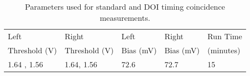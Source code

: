 \begin{table}
\caption{\label{tab:optimumparam} Parameters used for standard and DOI timing coincidence measurements.} 
\begin{tabular}{lllll}
\hline
Left &  Right & Left & Right & Run Time\\
Threshold (V) & Threshold (V)& Bias (mV) & Bias (mV) & (minutes)\\
\hline
1.64 , 1.56 &  1.64, 1.56 &  72.6 &  72.7 & 15\\
\hline
\end{tabular}
\end{table}

